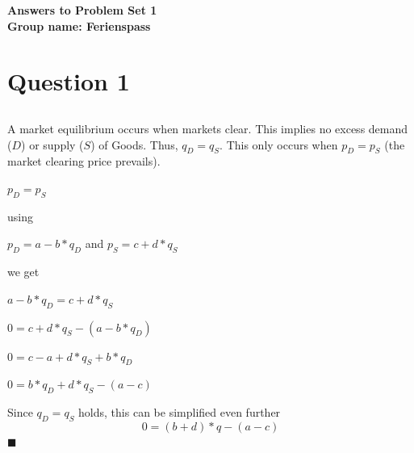 \documentclass{article}
\begin{document}
\begin{center}
\textbf{Answers to Problem Set 1\\
Group name: Ferienspass}
\end{center}

\section{Question 1}

\subsection{}
A market equilibrium occurs when markets clear. This implies no excess demand ($D$) or supply ($S$) of Goods. Thus, $q_D = q_S$. This only occurs when $p_D = p_S$ (the market clearing price prevails).
\begin{center} $p_D = p_S$ \end{center}
using
\begin{center} $p_D=a-b*q_D $ and $p_S=c+d*q_S$\end{center}
 we get
\begin{center} $a-b*q_D =c+d*q_S$ \end{center}
\begin{center} $0 =c+d*q_S-(a-b*q_D)$ \end{center}
\begin{center} $0 =c-a+d*q_S+b*q_D$ \end{center}
\begin{center} $0 =b*q_D+d*q_S-(a-c)$ \end{center}
Since $q_D = q_S$ holds, this can be simplified even further 
 \begin{equation} \label{First_One}0 =(b+d)*q-(a-c)\end{equation} $\blacksquare$
 
\subsection{}
\end{document}
